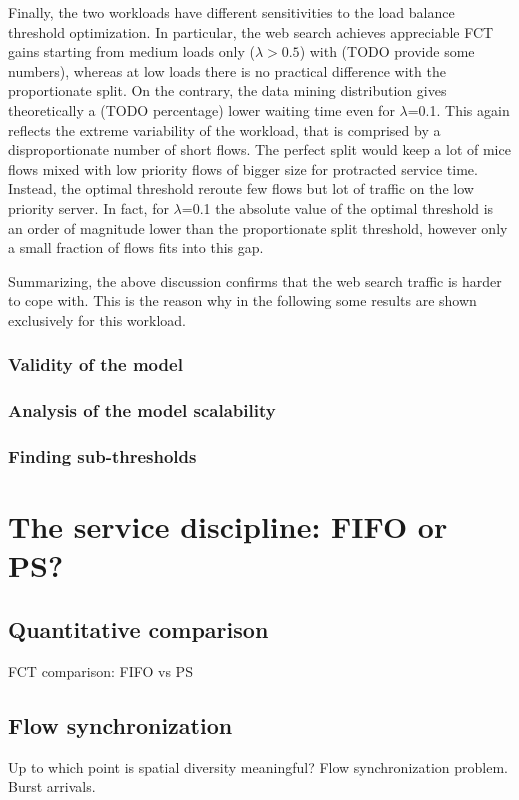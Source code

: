 Finally, the two workloads have different sensitivities to the load balance threshold optimization. In particular, the web search achieves appreciable FCT gains starting from medium loads only ($\lambda > 0.5$) with (TODO provide some numbers), whereas at low loads there is no practical difference with the proportionate split. On the contrary, the data mining distribution gives theoretically a (TODO percentage) lower waiting time even for $\lambda$=0.1. This again reflects the extreme variability of the workload, that is comprised by a disproportionate number of short flows. The perfect split would keep a lot of mice flows mixed with low priority flows of bigger size for protracted service time. Instead, the optimal threshold reroute few flows but lot of traffic on the low priority server. In fact, for $\lambda$=0.1 the absolute value of the optimal threshold is an order of magnitude lower than the proportionate split threshold, however only a small fraction of flows fits into this gap. 

Summarizing, the above discussion confirms that the web search traffic is harder to cope with. This is the reason why in the following some results are shown exclusively for this workload.
\subsubsection{Validity of the model}

\subsubsection{Analysis of the model scalability}

\subsubsection{Finding sub-thresholds}

\section{The service discipline: FIFO or PS?}

\subsection{Quantitative comparison}
FCT comparison: FIFO vs PS
\subsection{Flow synchronization}
Up to which point is spatial diversity meaningful? Flow synchronization problem. Burst arrivals. 
